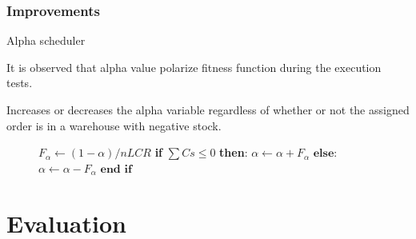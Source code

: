 \documentclass[t,compress,11pt,xcolor=dvipsnames,pdf,english]{beamer}
\begin{document}
\begin{frame}[c]{ }
    \frametitle{Improvements}
    \begin{block}{Alpha scheduler}
        {
            It is observed that alpha value polarize fitness function during the execution tests.

            Increases or decreases the alpha variable regardless of whether or not the assigned order is in a warehouse with negative stock.
        }
    \end{block}

    \vspace{\baselineskip}

    \begin{figure}[ht]
        \centering
        \begin{minipage}{0.5\linewidth}
            \begin{algorithmic}[H]
                \STATE  $F_{\alpha}  \longleftarrow (1-\alpha) / nLCR$ 
                \STATE
                \STATE  \textbf{if} $\sum Cs \leqslant 0$ \textbf{then}:
                \STATE  \quad $\alpha \longleftarrow \alpha + F_{\alpha}$
                \STATE  $\textbf{else:}$
                \STATE  \quad $\alpha \longleftarrow \alpha - F_{\alpha}$
                \STATE  $\textbf{end if}$
            \end{algorithmic}
        \end{minipage}
    \end{figure}

\end{frame}


\section{Evaluation}
\end{document}
